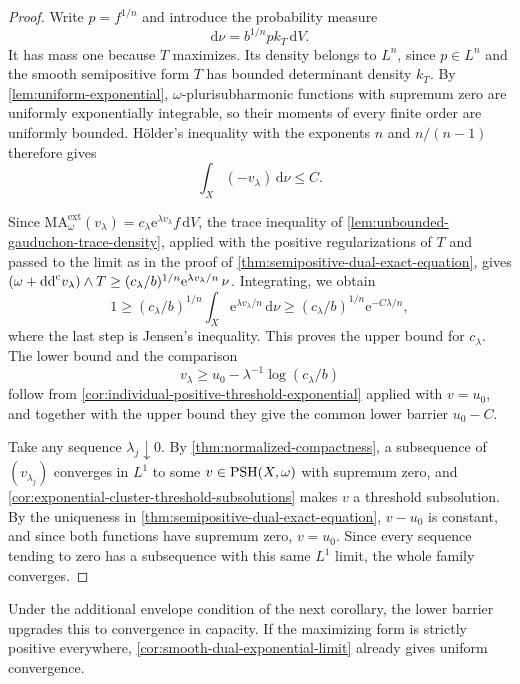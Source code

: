 \begin{proof}
Write $p=f^{1/n}$ and introduce the probability measure
\[
 \mathrm{d}\nu=b^{1/n}p k_T\,\mathrm{d}V.
\]
It has mass one because $T$ maximizes. Its density belongs to $L^n$, since $p\in L^n$ and the smooth semipositive form $T$ has bounded determinant density $k_T$. By \cref{lem:uniform-exponential}, $\omega$-plurisubharmonic functions with supremum zero are uniformly exponentially integrable, so their moments of every finite order are uniformly bounded. H\"older's inequality with the exponents $n$ and $n/(n-1)$ therefore gives
\[
 \int_X(-v_\lambda)\,\mathrm{d}\nu\leq C.
\]

Since $\mathrm{MA}^{\mathrm{ext}}_\omega(v_\lambda)=c_\lambda\mathrm{e}^{\lambda v_\lambda}f\,\mathrm{d}V$, the trace inequality of \cref{lem:unbounded-gauduchon-trace-density}, applied with the positive regularizations of $T$ and passed to the limit as in the proof of \cref{thm:semipositive-dual-exact-equation}, gives $(\omega+\mathrm{dd}^{\mathrm{c}} v_\lambda)\wedge T\geq(c_\lambda/b)^{1/n}\mathrm{e}^{\lambda v_\lambda/n}\,\nu$. Integrating, we obtain
\[
 1\geq(c_\lambda/b)^{1/n}
       \int_X\mathrm{e}^{\lambda v_\lambda/n}\,\mathrm{d}\nu
 \geq(c_\lambda/b)^{1/n}\mathrm{e}^{-C\lambda/n},
\]
where the last step is Jensen's inequality. This proves the upper bound for $c_\lambda$. The lower bound and the comparison
\[
 v_\lambda\geq u_0-\lambda^{-1}\log(c_\lambda/b)
\]
follow from \cref{cor:individual-positive-threshold-exponential} applied with $v=u_0$, and together with the upper bound they give the common lower barrier $u_0-C$.

Take any sequence $\lambda_j\downarrow0$. By \cref{thm:normalized-compactness}, a subsequence of $(v_{\lambda_j})$ converges in $L^1$ to some $v\in\mathrm{PSH}(X,\omega)$ with supremum zero, and \cref{cor:exponential-cluster-threshold-subsolutions} makes $v$ a threshold subsolution. By the uniqueness in \cref{thm:semipositive-dual-exact-equation}, $v-u_0$ is constant, and since both functions have supremum zero, $v=u_0$. Since every sequence tending to zero has a subsequence with this same $L^1$ limit, the whole family converges.
\end{proof}

Under the additional envelope condition of the next corollary, the lower barrier upgrades this to convergence in capacity. If the maximizing form is strictly positive everywhere, \cref{cor:smooth-dual-exponential-limit} already gives uniform convergence.
